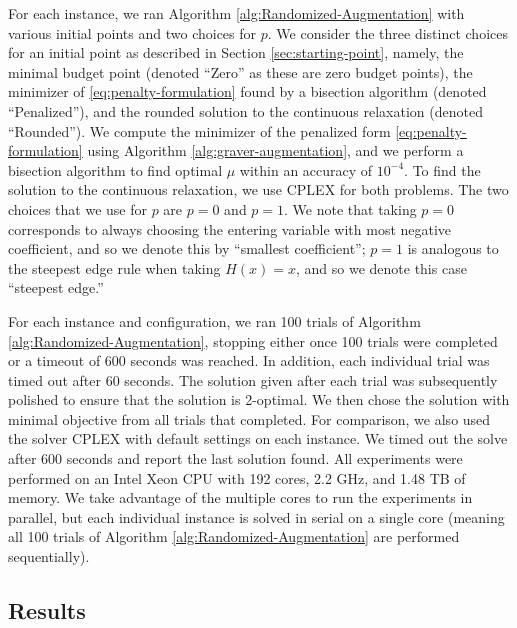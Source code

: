 \documentclass[pdflatex,sn-mathphys-num]{sn-jnl}%
\begin{document}
For each instance, we ran Algorithm \ref{alg:Randomized-Augmentation} with various initial points and two choices for $p$. We consider the three distinct choices for an initial point as described in Section \ref{sec:starting-point}, namely, the minimal budget point (denoted ``Zero'' as these are zero budget points), the minimizer of \eqref{eq:penalty-formulation} found by a bisection algorithm (denoted ``Penalized''), and the rounded solution to the continuous relaxation (denoted ``Rounded''). We compute the minimizer of the penalized form \eqref{eq:penalty-formulation} using Algorithm \ref{alg:graver-augmentation}, and we perform a bisection algorithm to find optimal $\mu$ within an accuracy of $10^{-4}$. To find the solution to the continuous relaxation, we use CPLEX for both problems. The two choices that we use for $p$  are $p=0$ and $p=1$. We note that taking $p=0$ corresponds to always choosing the entering variable with most negative coefficient, and so we denote this by ``smallest coefficient'';  $p=1$ is analogous to the steepest edge rule when taking $H(x) = x$, and so we denote this case ``steepest edge.''

For each instance and configuration, we ran 100 trials of Algorithm \ref{alg:Randomized-Augmentation}, stopping either once 100 trials were completed or a timeout of 600 seconds was reached. In addition, each individual trial was timed out after 60 seconds. The solution given after each trial was subsequently polished to ensure that the solution is 2-optimal. We then chose the solution with minimal objective from all trials that completed. For comparison, we also used the solver CPLEX with default settings on each instance. We timed out the solve after 600 seconds and report the last solution found.
All experiments were performed on an Intel Xeon CPU with 192 cores, 2.2 GHz, and 1.48 TB of memory. We take advantage of the multiple cores to run the experiments in parallel, but each individual instance is solved in serial on a single core (meaning all 100 trials of Algorithm \ref{alg:Randomized-Augmentation} are performed sequentially).

\subsection{Results}
\end{document}
